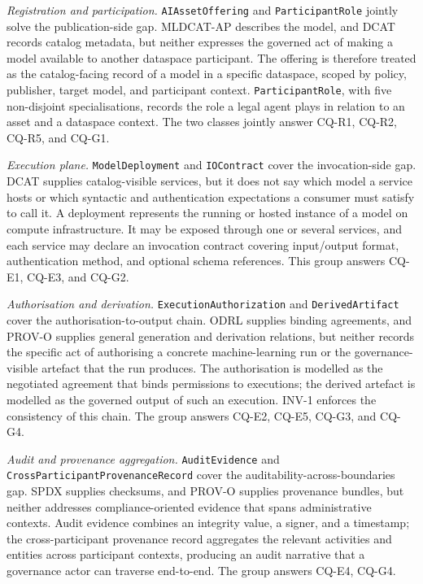 \documentclass[11pt,a4paper]{article}
\newcommand{\code}[1]{\texttt{#1}}
\begin{document}
\medskip\noindent\emph{Registration and participation.}
\code{AIAssetOffering} and \code{ParticipantRole} jointly solve the publication-side gap. MLDCAT-AP describes the model, and DCAT records catalog metadata, but neither expresses the governed act of making a model available to another dataspace participant. The offering is therefore treated as the catalog-facing record of a model in a specific dataspace, scoped by policy, publisher, target model, and participant context. \code{ParticipantRole}, with five non-disjoint specialisations, records the role a legal agent plays in relation to an asset and a dataspace context. The two classes jointly answer CQ-R1, CQ-R2, CQ-R5, and CQ-G1.

\medskip\noindent\emph{Execution plane.}
\code{ModelDeployment} and \code{IOContract} cover the invocation-side gap. DCAT supplies catalog-visible services, but it does not say which model a service hosts or which syntactic and authentication expectations a consumer must satisfy to call it. A deployment represents the running or hosted instance of a model on compute infrastructure. It may be exposed through one or several services, and each service may declare an invocation contract covering input/output format, authentication method, and optional schema references. This group answers CQ-E1, CQ-E3, and CQ-G2.

\medskip\noindent\emph{Authorisation and derivation.}
\code{ExecutionAuthorization} and \code{DerivedArtifact} cover the authorisation-to-output chain. ODRL supplies binding agreements, and PROV-O supplies general generation and derivation relations, but neither records the specific act of authorising a concrete machine-learning run or the governance-visible artefact that the run produces. The authorisation is modelled as the negotiated agreement that binds permissions to executions; the derived artefact is modelled as the governed output of such an execution. INV-1 enforces the consistency of this chain. The group answers CQ-E2, CQ-E5, CQ-G3, and CQ-G4.

\medskip\noindent\emph{Audit and provenance aggregation.}
\code{AuditEvidence} and \code{CrossParticipantProvenanceRecord} cover the auditability-across-boundaries gap. SPDX supplies checksums, and PROV-O supplies provenance bundles, but neither addresses compliance-oriented evidence that spans administrative contexts. Audit evidence combines an integrity value, a signer, and a timestamp; the cross-participant provenance record aggregates the relevant activities and entities across participant contexts, producing an audit narrative that a governance actor can traverse end-to-end. The group answers CQ-E4, CQ-G4.
\end{document}
